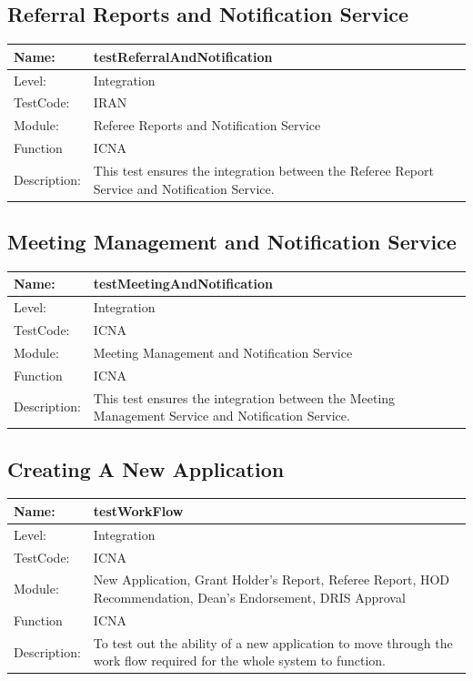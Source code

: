 \documentclass[12pt]{article}
\begin{document}
\subsection{Referral Reports and Notification Service}
\begin{center}
\begin{tabular}{|l|p{12cm}|}
\hline
 Name: & testReferralAndNotification  \\
\hline
Level: & Integration \\
\hline
TestCode: & IRAN \\
\hline
Module:& Referee Reports and Notification Service \\
\hline
Function & ICNA \\
\hline
Description: & This test ensures the integration between the Referee Report Service and Notification Service. \\
\hline
\end{tabular}
\end{center}

\subsection{Meeting Management and Notification Service}
\begin{center}
\begin{tabular}{|l|p{12cm}|}
\hline
 Name: & testMeetingAndNotification  \\
\hline
Level: & Integration \\
\hline
TestCode: & ICNA \\
\hline
Module:& Meeting Management and Notification Service \\
\hline
Function & ICNA \\
\hline
Description: & This test ensures the integration between the Meeting Management Service and Notification Service. \\
\hline
\end{tabular}
\end{center}

\subsection{Creating A New Application}
\begin{center}
\begin{tabular}{|l|p{12cm}|}
\hline
 Name: & testWorkFlow  \\
\hline
Level: & Integration \\
\hline
TestCode: & ICNA \\
\hline
Module:& New Application, Grant Holder's Report, Referee Report, HOD Recommendation, Dean's Endorsement, DRIS Approval \\
\hline
Function & ICNA \\
\hline
Description: & To test out the ability of a new application to move through the work flow required for the whole system to function. \\
\hline
\end{tabular}
\end{center}
\end{document}
